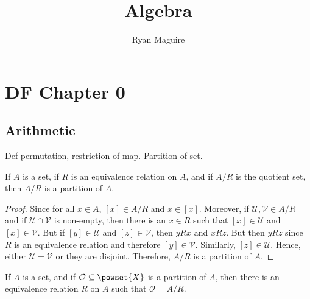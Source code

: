 \documentclass{article}                                                        %
\begin{document}
    \title{Algebra}
    \author{Ryan Maguire}
    \date{\vspace{-5ex}}
    \maketitle
    \tableofcontents
    \clearpage
    \section{DF Chapter 0}
        \subsection{Arithmetic}
            Def permutation, restriction of map. Partition of set.
            \begin{theorem}
                \label{thm:Equiv_Classes_Form_Partition}%
                If $A$ is a set, if $R$ is an equivalence relation on $A$, and
                if $A/R$ is the quotient set, then $A/R$ is a partition of $A$.
            \end{theorem}
            \begin{proof}
                Since for all $x\in{A}$, $[x]\in{A}/R$ and $x\in[x]$. Moreover,
                if $\mathcal{U},\mathcal{V}\in{A}/R$ and if
                $\mathcal{U}\cap\mathcal{V}$ is non-empty, then there is an
                $x\in{R}$ such that $[x]\in\mathcal{U}$ and $[x]\in\mathcal{V}$.
                But if $[y]\in\mathcal{U}$ and $[z]\in\mathcal{V}$, then
                $yRx$ and $xRz$. But then $yRz$ since $R$ is an equivalence
                relation and therefore $[y]\in\mathcal{V}$. Similarly,
                $[z]\in\mathcal{U}$. Hence, either $\mathcal{U}=\mathcal{V}$ or
                they are disjoint. Therefore, $A/R$ is a partition of $A$.
            \end{proof}
            \begin{theorem}
                If $A$ is a set, and if $\mathcal{O}\subseteq\powset{X}$ is a
                partition of $A$, then there is an equivalence relation $R$ on
                $A$ such that $\mathcal{O}=A/R$.
            \end{theorem}
\end{document}
